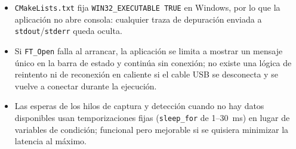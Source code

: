 \documentclass[../main.tex]{subfiles}
\begin{document}
\begin{itemize}
    \item \texttt{CMakeLists.txt} fija \texttt{WIN32\_EXECUTABLE TRUE} en Windows, por lo que la aplicación no abre consola: cualquier traza de depuración enviada a \texttt{stdout}/\texttt{stderr} queda oculta.
    \item Si \texttt{FT\_Open} falla al arrancar, la aplicación se limita a mostrar un mensaje único en la barra de estado y continúa sin conexión; no existe una lógica de reintento ni de reconexión en caliente si el cable USB se desconecta y se vuelve a conectar durante la ejecución.
    \item Las esperas de los hilos de captura y detección cuando no hay datos disponibles usan temporizaciones fijas (\texttt{sleep\_for} de 1--30~ms) en lugar de variables de condición; funcional pero mejorable si se quisiera minimizar la latencia al máximo.
\end{itemize}
\end{document}
